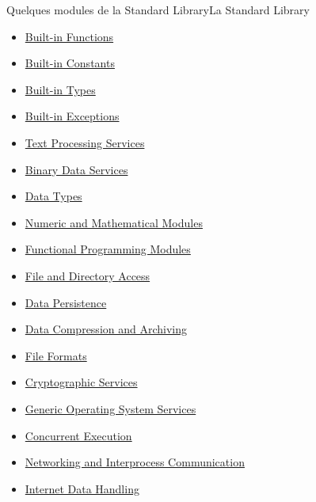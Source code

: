 \documentclass{beamer}
\begin{document}
\begin{frame}{Quelques modules de la Standard Library}{La Standard Library}
\begin{tiny}
            \begin{itemize}
                \item \href{https://docs.python.org/3/library/functions.html}{Built-in Functions}
                \item \href{https://docs.python.org/3/library/constants.html}{Built-in Constants}
                \item \href{https://docs.python.org/3/library/stdtypes.html}{Built-in Types}
                \item \href{https://docs.python.org/3/library/exceptions.html}{Built-in Exceptions}
                \item \href{https://docs.python.org/3/library/text.html}{Text Processing Services}
                \item \href{https://docs.python.org/3/library/binary.html}{Binary Data Services}
                \item \href{https://docs.python.org/3/library/datatypes.html}{Data Types}
                \item \href{https://docs.python.org/3/library/numeric.html}{Numeric and Mathematical Modules}
                \item \href{https://docs.python.org/3/library/functional.html}{Functional Programming Modules}
                \item \href{https://docs.python.org/3/library/filesys.html}{File and Directory Access}
                \item \href{https://docs.python.org/3/library/persistence.html}{Data Persistence}
                \item \href{https://docs.python.org/3/library/archiving.html}{Data Compression and Archiving}
                \item \href{https://docs.python.org/3/library/fileformats.html}{File Formats}
                \item \href{https://docs.python.org/3/library/crypto.html}{Cryptographic Services}
                \item \href{https://docs.python.org/3/library/allos.html}{Generic Operating System Services}
                \item \href{https://docs.python.org/3/library/concurrency.html}{Concurrent Execution}
                \item \href{https://docs.python.org/3/library/ipc.html}{Networking and Interprocess Communication}
                \item \href{https://docs.python.org/3/library/netdata.html}{Internet Data Handling}

\end{itemize}
\end{tiny}
\end{frame}
\end{document}
